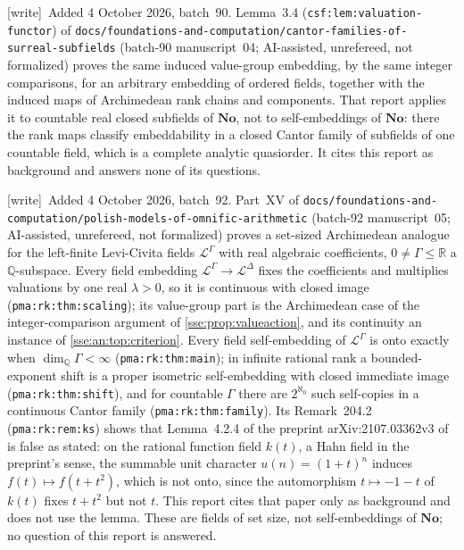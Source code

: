 \documentclass[11pt,a4paper]{article}
\numberwithin{equation}{section}
\theoremstyle{plain}
\theoremstyle{definition}
\theoremstyle{remark}
\newcommand{\No}{\mathbf{No}}
\newcommand{\R}{\mathbb{R}}
\newcommand{\Q}{\mathbb{Q}}
\newcommand{\lbl}[1]{\nolinkurl{#1}}%
\newcommand{\fn}[1]{\nolinkurl{#1}}%
\newcommand{\wtag}{\textup{\textsf{[write]}}}%
\newenvironment{wnote}{\par\smallskip\noindent\wtag\ }{\par\smallskip}
\begin{document}
\begin{wnote}Added 4 October 2026, batch~90. Lemma~3.4 (\lbl{csf:lem:valuation-functor}) of \fn{docs/foundations-and-computation/cantor-families-of-surreal-subfields} (batch-90 manuscript~04; AI-assisted, unrefereed, not formalized) proves the same induced value-group embedding, by the same integer comparisons, for an arbitrary embedding of ordered fields, together with the induced maps of Archimedean rank chains and components. That report applies it to countable real closed subfields of $\No$, not to self-embeddings of $\No$: there the rank maps classify embeddability in a closed Cantor family of subfields of one countable field, which is a complete analytic quasiorder. It cites this report as background and answers none of its questions.\end{wnote}
\begin{wnote}Added 4 October 2026, batch~92. Part~XV of \fn{docs/foundations-and-computation/polish-models-of-omnific-arithmetic} (batch-92 manuscript~05; AI-assisted, unrefereed, not formalized) proves a set-sized Archimedean analogue for the left-finite Levi-Civita fields $\mathcal L^\Gamma$ with real algebraic coefficients, $0\ne\Gamma\le\R$ a $\Q$-subspace. Every field embedding $\mathcal L^\Gamma\to\mathcal L^\Delta$ fixes the coefficients and multiplies valuations by one real $\lambda>0$, so it is continuous with closed image (\lbl{pma:rk:thm:scaling}); its value-group part is the Archimedean case of the integer-comparison argument of \cref{sse:prop:valueaction}, and its continuity an instance of \cref{sse:an:top:criterion}. Every field self-embedding of $\mathcal L^\Gamma$ is onto exactly when $\dim_\Q\Gamma<\infty$ (\lbl{pma:rk:thm:main}); in infinite rational rank a bounded-exponent shift is a proper isometric self-embedding with closed immediate image (\lbl{pma:rk:thm:shift}), and for countable $\Gamma$ there are $2^{\aleph_0}$ such self-copies in a continuous Cantor family (\lbl{pma:rk:thm:family}). Its Remark~204.2 (\lbl{pma:rk:rem:ks}) shows that Lemma~4.2.4 of the preprint arXiv:2107.03362v3 of \cite{KS} is false as stated: on the rational function field $k(t)$, a Hahn field in the preprint's sense, the summable unit character $u(n)=(1+t)^n$ induces $f(t)\mapsto f(t+t^2)$, which is not onto, since the automorphism $t\mapsto-1-t$ of $k(t)$ fixes $t+t^2$ but not $t$. This report cites that paper only as background and does not use the lemma. These are fields of set size, not self-embeddings of $\No$; no question of this report is answered.\end{wnote}
\end{document}
